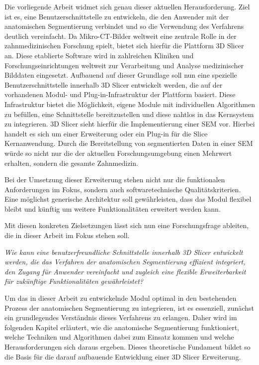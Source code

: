 Die vorliegende Arbeit widmet sich genau dieser aktuellen Herausforderung. Ziel
ist es, eine Benutzerschnittstelle zu entwickeln, die den Anwender mit der
anatomischen Segmentierung verbindet und so die Verwendung des Verfahrens
deutlich vereinfacht. Da Mikro-\ac{CT}-Bilder weltweit eine zentrale Rolle in
der zahnmedizinischen Forschung spielt, bietet sich hierfür die Plattform 3D Slicer
an. Diese etablierte Software wird in zahlreichen Kliniken und
Forschungseinrichtungen weltweit zur Verarbeitung und Analyse medizinischer
Bilddaten eingesetzt. Aufbauend auf dieser Grundlage soll nun eine spezielle Benutzerschnittstelle
innerhalb 3D Slicer entwickelt werden, die auf der vorhandenen Modul- und Plug-in-Infrastruktur
der Plattform basiert. Diese Infrastruktur bietet die Möglichkeit, eigene Module
mit individuellen Algorithmen zu befüllen, eine Schnittstelle bereitzustellen
und diese nahtlos in das Kernsystem zu integrieren. 3D Slicer sieht hierfür die Implementierung
einer \ac{SEM} vor. Hierbei handelt es sich um einer Erweiterung oder ein Plug-in
für die Slice Kernanwendung. Durch die Bereitstellung von segmentierten Daten in
einer \ac{SEM} würde so nicht nur die der aktuellen Forschungsumgebung einen Mehrwert
erhalten, sondern die gesamte Zahnmedizin.

Bei der Umsetzung dieser Erweiterung stehen nicht nur die funktionalen
Anforderungen im Fokus, sondern auch softwaretechnische Qualitätskriterien. Eine
möglichst generische Architektur soll gewährleisten, dass das Modul flexibel bleibt
und künftig um weitere Funktionalitäten erweitert werden kann.

Mit diesen konkreten Zielsetzungen lässt sich nun eine Forschungsfrage ableiten,
die in dieser Arbeit im Fokus stehen soll.

\begin{center}
	\textit{Wie kann eine benutzerfreundliche Schnittstelle innerhalb 3D Slicer
	entwickelt werden, die das Verfahren der anatomischen Segmentierung effizient integriert,
	den Zugang für Anwender vereinfacht und zugleich eine flexible Erweiterbarkeit
	für zukünftige Funktionalitäten gewährleistet?}
\end{center}

Um das in dieser Arbeit zu entwickelnde Modul optimal in den bestehenden Prozess
der anatomischen Segmentierung zu integrieren, ist es essenziell, zunächst ein grundlegendes
Verständnis dieses Verfahrens zu erlangen. Daher wird im folgenden Kapitel
erläutert, wie die anatomische Segmentierung funktioniert, welche Techniken und
Algorithmen dabei zum Einsatz kommen und welche Herausforderungen sich daraus
ergeben. Dieses theoretische Fundament bildet so die Basis für die darauf aufbauende
Entwicklung einer 3D Slicer Erweiterung.
